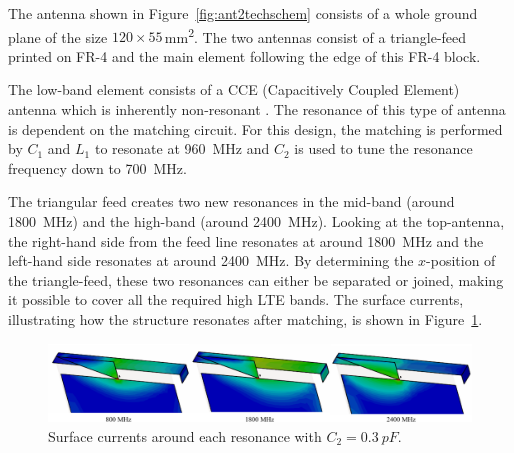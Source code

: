 The antenna shown in Figure~\ref{fig:ant2techschem} consists of a whole ground plane of the size $120\times55$\,\si{mm\squared}. The two antennas consist of a triangle-feed printed on FR-4 and the main element following the edge of this FR-4 block.

The low-band element consists of a CCE (Capacitively Coupled Element) antenna which is inherently non-resonant \cite{valkonen2013inherently,ilvonen2014design}. The resonance of this type of antenna is dependent on the matching circuit. For this design, the matching is performed by $C_1$ and $L_1$ to resonate at \SI{960}{MHz} and $C_2$ is used to tune the resonance frequency down to \SI{700}{MHz}.

The triangular feed creates two new resonances in the mid-band (around \SI{1800}{MHz}) and the high-band (around \SI{2400}{MHz}). Looking at the top-antenna, the right-hand side from the feed line resonates at around \SI{1800}{MHz} and the left-hand side resonates at around \SI{2400}{MHz}. By determining the $x$-position of the triangle-feed, these two resonances can either be separated or joined, making it possible to cover all the required high LTE bands. The surface currents, illustrating how the structure resonates after matching, is shown in Figure~\ref{fig:ant2surfaces}.

\begin{figure}[htbp]
    \centering
    \includegraphics{img/tech_sol/trianglefeed/surface_currents}
    \caption{Surface currents around each resonance with $C_2=\SI{0.3}{pF}$.}
    \label{fig:ant2surfaces}
\end{figure}

